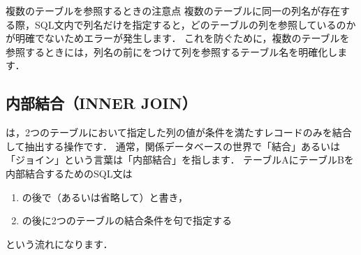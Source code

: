 \begin{notebox}{複数のテーブルを参照するときの注意点}
複数のテーブルに同一の列名が存在する際，SQL文内で列名だけを指定すると，どのテーブルの列を参照しているのかが明確でないためエラーが発生します．
これを防ぐために，複数のテーブルを参照するときには，列名の前にをつけて列を参照するテーブル名を明確化します．
\end{notebox}


\subsection{内部結合（INNER JOIN）}
 は，2つのテーブルにおいて指定した列の値が条件を満たすレコードのみを結合して抽出する操作です．
通常，関係データベースの世界で「結合」あるいは「ジョイン」という言葉は「内部結合」を指します．
テーブルAにテーブルBを内部結合するためのSQL文は
\begin{enumerate}
\item {}の後で（あるいは省略して）と書き，
\item {}の後に2つのテーブルの結合条件を句で指定する
\end{enumerate}
という流れになります．

